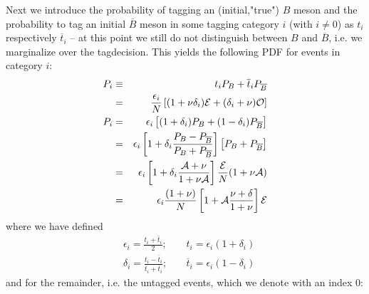 \documentclass[a4paper,9pt,twosided]{article}
\begin{document}
Next we introduce the probability of tagging an (initial,"true") $B$ meson  and
the probability to tag an initial $\overline{B}$ meson in some tagging category $i$ (with $i\ne 0$) as $t_i$
respectively $\overline{t}_i$ -- at this point we still do not distinguish between $B$ and $\overline{B}$, i.e.
we marginalize over the tagdecision.  This yields the following PDF for events in category $i$:
\begin{eqnarray}
     P_i & \equiv & t_i P_B + \overline{t}_i P_{\overline B}  \nonumber
\\       &      = & \frac{\epsilon_i}{N} \left[ (1+\nu\delta_i ){\cal E}+(\delta_i + \nu){\cal O} \right] 
\\  P_i  &      = & \epsilon_i \left[ (1+\delta_i ) P_B + (1-\delta_i) P_{\overline{B}} \right]
\\       &      = & \epsilon_i \left[ 1+ \delta_i \frac{ P_B -  P_{\overline{B}}}{ P_B +  P_{\overline{B}}} \right]\left[ P_B + P_{\overline{B}}  \right]
\\       &      = & \epsilon_i\left[1 +\delta_i \frac{{\cal A}+ \nu}{1+\nu{\cal A} } \right] \frac{\cal E}{N}( 1 + \nu {\cal A} ) 
\\       &      = & \epsilon_i \frac{ (1+\nu )}{N} \left[1+{\cal A}\frac{\nu+\delta}{1+\nu} \right] {\cal E}
\end{eqnarray}
where we have defined
\begin{eqnarray}
   &\epsilon_i = \frac{ t_i + \overline{t}_i }{2};\;\;\;\;  & t_i = \epsilon_i( 1 + \delta_i ) \\
   &\delta_i = \frac{t_i - \overline{t}_i}{t_i + \overline{t}_i}; & \overline{t}_i = \epsilon_i( 1 - \delta_i ) 
\end{eqnarray}
and for the remainder, i.e. the untagged events, which we denote with an index $0$:
\end{document}
